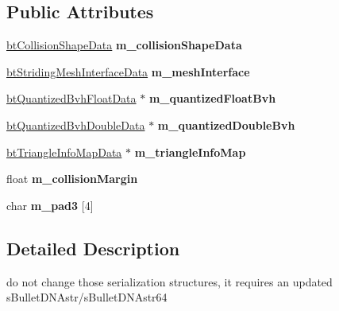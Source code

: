 \subsection*{Public Attributes}
\begin{DoxyCompactItemize}
\item 
\mbox{\label{structbtTriangleMeshShapeData_a506e71267b5147cfbb1d2e0608d2df03}} 
\hyperlink{structbtCollisionShapeData}{bt\+Collision\+Shape\+Data} {\bfseries m\+\_\+collision\+Shape\+Data}
\item 
\mbox{\label{structbtTriangleMeshShapeData_a09fa7f39afd4977baebde7c100b64e62}} 
\hyperlink{structbtStridingMeshInterfaceData}{bt\+Striding\+Mesh\+Interface\+Data} {\bfseries m\+\_\+mesh\+Interface}
\item 
\mbox{\label{structbtTriangleMeshShapeData_aaf6efdc294280ec115339a74e68ecfe8}} 
\hyperlink{structbtQuantizedBvhFloatData}{bt\+Quantized\+Bvh\+Float\+Data} $\ast$ {\bfseries m\+\_\+quantized\+Float\+Bvh}
\item 
\mbox{\label{structbtTriangleMeshShapeData_ab8cec38d0834928c1b4f910fe3a1c1ee}} 
\hyperlink{structbtQuantizedBvhDoubleData}{bt\+Quantized\+Bvh\+Double\+Data} $\ast$ {\bfseries m\+\_\+quantized\+Double\+Bvh}
\item 
\mbox{\label{structbtTriangleMeshShapeData_ad28344fa51594b8aceed24f41249a8f3}} 
\hyperlink{structbtTriangleInfoMapData}{bt\+Triangle\+Info\+Map\+Data} $\ast$ {\bfseries m\+\_\+triangle\+Info\+Map}
\item 
\mbox{\label{structbtTriangleMeshShapeData_a7e26d428e0a04f8ea794189d7d378d70}} 
float {\bfseries m\+\_\+collision\+Margin}
\item 
\mbox{\label{structbtTriangleMeshShapeData_a95fb0ecd84a2e0b0653717d1739a2c96}} 
char {\bfseries m\+\_\+pad3} \mbox{[}4\mbox{]}
\end{DoxyCompactItemize}


\subsection{Detailed Description}
do not change those serialization structures, it requires an updated s\+Bullet\+D\+N\+Astr/s\+Bullet\+D\+N\+Astr64 

